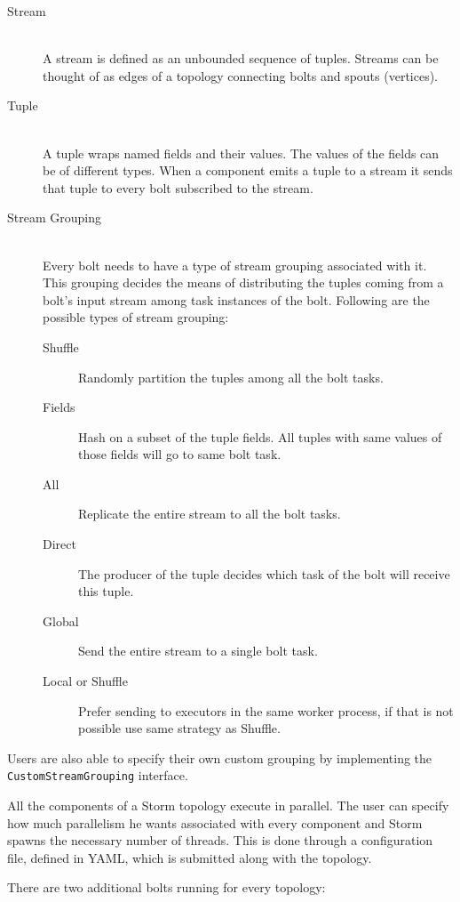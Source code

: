 \documentclass[bsc,twoside,singlespacing,normalheadings,parskip]{infthesis}\usepackage[]{graphicx}\usepackage[]{color}
\begin{document}
\begin{description}
  \item[Stream] \hfill \\
  A stream is defined as an unbounded sequence of tuples. Streams can be thought of as edges of a topology connecting bolts and spouts (vertices).
  \item[Tuple] \hfill \\
  A tuple wraps named fields and their values. The values of the fields can be of different types. When a component emits a tuple to a stream it sends that tuple to every bolt subscribed to the stream.
  \item[Stream Grouping] \hfill \\
  Every bolt needs to have a type of stream grouping associated with it. This grouping decides the means of distributing the tuples coming from a bolt's input stream among task instances of the bolt. Following are the possible types of stream grouping:
  \begin{description}
  	\item[Shuffle] Randomly partition the tuples among all the bolt tasks.
  	\item[Fields] Hash on a subset of the tuple fields. All tuples with same values of those fields will go to same bolt task.
  	\item[All] Replicate the entire stream to all the bolt tasks.
  	\item[Direct] The producer of the tuple decides which task of the bolt will receive this tuple.
  	\item[Global] Send the entire stream to a single bolt task.
  	\item[Local or Shuffle] Prefer sending to executors in the same worker process, if that is not possible use same strategy as Shuffle.
  \end{description}
\end{description}

Users are also able to specify their own custom grouping by implementing the \texttt{CustomStreamGrouping} interface.

All the components of a Storm topology execute in parallel. The user can specify how much parallelism he wants associated with every component and Storm spawns the necessary number of threads. This is done through a configuration file, defined in YAML, which is submitted along with the topology.

There are two additional bolts running for every topology:
\end{document}
